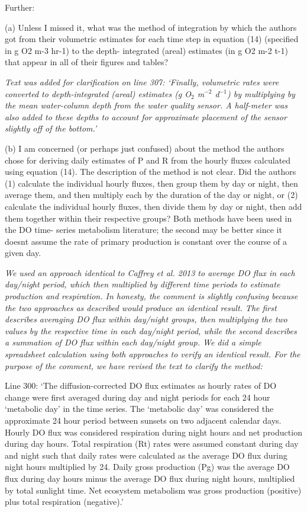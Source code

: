 \documentclass[letterpaper,12pt]{article}\usepackage[]{graphicx}\usepackage[]{color}
\begin{document}
Further:

(a) Unless I missed it, what was the method of integration by which the authors got from their volumetric estimates for each time step in equation (14) (specified in g O2 m-3 hr-1) to the depth- integrated (areal) estimates (in g O2 m-2 t-1) that appear in all of their figures and tables?

{\it Text was added for clarification on line 307: `Finally, volumetric rates were converted to depth-integrated (areal) estimates (g O$_2$ m$^{-2}$ d$^{-1}$) by multiplying by the mean water-column depth from the water quality sensor.  A half-meter was also added to these depths to account for approximate placement of the sensor slightly off of the bottom.' 
}

(b) I am concerned (or perhaps just confused) about the method the authors chose for deriving daily estimates of P and R from the hourly fluxes calculated using equation (14). The description of the method is not clear. Did the authors (1) calculate the individual hourly fluxes, then group them by day or night, then average them, and then multiply each by the duration of the day or night, or (2) calculate the individual hourly fluxes, then divide them by day or night, then add them together within their respective groups? Both methods have been used in the DO time- series metabolism literature; the second may be better since it doesnt assume the rate of primary production is constant over the course of a given day.

{\it We used an approach identical to Caffrey et al. 2013 to average DO flux in each day/night period, which then multiplied by different time periods to estimate production and respiration.  In honesty, the comment is slightly confusing because the two approaches as described would produce an identical result.  The first describes averaging DO flux within day/night groups, then multiplying the two values by the respective time in each day/night period, while the second describes a summation of DO flux within each day/night group.  We did a simple spreadsheet calculation using both approaches to verify an identical result.  For the purpose of the comment, we have revised the text to clarify the method:

Line 300: `The diffusion-corrected DO flux estimates as hourly rates of DO change were first averaged during day and night periods for each 24 hour `metabolic day' in the time series. The `metabolic day' was considered the approximate 24 hour period between sunsets on two adjacent calendar days.  Hourly DO flux was considered respiration during night hours and net production during day hours.  Total respiration (Rt) rates were assumed constant during day and night such that daily rates were calculated as the average DO flux during night hours multiplied by 24. Daily gross production (Pg) was the average DO flux during day hours minus the average DO flux during night hours, multiplied by total sunlight time.  Net ecosystem metabolism was gross production (positive) plus total respiration (negative).'
}
\end{document}
